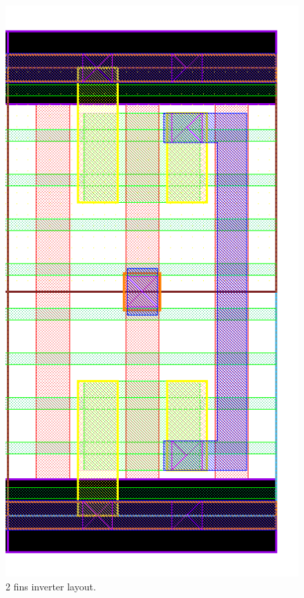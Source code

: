 \documentclass[pgmicro,mestrado,english]{iiufrgs}
\begin{document}
\begin{figure}[]
\centering
\includegraphics[width=\textwidth,height=\textheight,keepaspectratio]{INV2F.png}
\caption{2 fins inverter layout.}
\label{fig:INV2F}
\end{figure}
\end{document}
